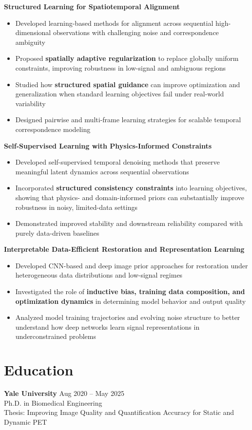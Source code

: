\textbf{Structured Learning for Spatiotemporal Alignment}
\begin{itemize}[leftmargin=*]
\item Developed learning-based methods for alignment across sequential high-dimensional observations with challenging noise and correspondence ambiguity
\item Proposed \textbf{spatially adaptive regularization} to replace globally uniform constraints, improving robustness in low-signal and ambiguous regions
\item Studied how \textbf{structured spatial guidance} can improve optimization and generalization when standard learning objectives fail under real-world variability
\item Designed pairwise and multi-frame learning strategies for scalable temporal correspondence modeling
\end{itemize}

\textbf{Self-Supervised Learning with Physics-Informed Constraints}
\begin{itemize}[leftmargin=*]
\item Developed self-supervised temporal denoising methods that preserve meaningful latent dynamics across sequential observations
\item Incorporated \textbf{structured consistency constraints} into learning objectives, showing that physics- and domain-informed priors can substantially improve robustness in noisy, limited-data settings
\item Demonstrated improved stability and downstream reliability compared with purely data-driven baselines
\end{itemize}

\textbf{Interpretable Data-Efficient Restoration and Representation Learning}
\begin{itemize}[leftmargin=*]
\item Developed CNN-based and deep image prior approaches for restoration under heterogeneous data distributions and low-signal regimes
\item Investigated the role of \textbf{inductive bias, training data composition, and optimization dynamics} in determining model behavior and output quality
\item Analyzed model training trajectories and evolving noise structure to better understand how deep networks learn signal representations in underconstrained problems
\end{itemize}

\section{Education}
\textbf{Yale University} \hfill Aug 2020 -- May 2025 \\
Ph.D. in Biomedical Engineering \\
Thesis: Improving Image Quality and Quantification Accuracy for Static and Dynamic PET


